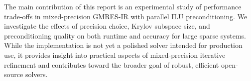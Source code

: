 The main contribution of this report is an experimental study of performance
trade-offs in mixed-precision GMRES-IR with parallel ILU preconditioning. We
investigate the effects of precision choice, Krylov subspace size, and
preconditioning quality on both runtime and accuracy for large sparse systems.
While the implementation is not yet a polished solver intended for production
use, it provides insight into practical aspects of mixed-precision iterative
refinement and contributes toward the broader goal of robust, efficient
open-source solvers.
